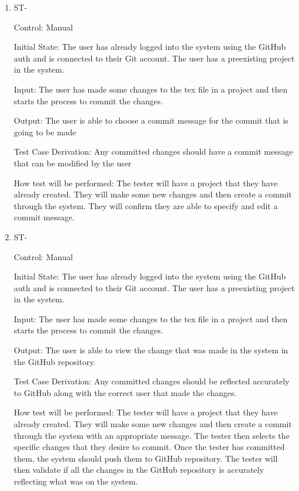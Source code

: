 \documentclass[12pt, titlepage]{article}
\newcounter{TESTID}
\newcommand\TESTNUM{\stepcounter{TESTID}\theTESTID}
\begin{document}
\begin{enumerate}
		\item{ST-\TESTNUM\\}
		
		Control: Manual
		
		Initial State: The user has already logged into the system using the GitHub auth and is connected to their Git account. The user has a preexisting project in the system.
		
		Input: The user has made some changes to the tex file in a project and then starts the process to commit the changes. 
		
		Output: The user is able to choose a commit message for the commit that is going to be made
		
		Test Case Derivation: Any committed changes should have a commit message that can be modified by the user
		
		How test will be performed: The tester will have a project that they have already created. They will make some new changes and then create a commit through the system. They will confirm they are able to specify and edit a commit message.
		
		\item{ST-\TESTNUM\\}
		
		Control: Manual
		
		Initial State: The user has already logged into the system using the GitHub auth and is connected to their Git account. The user has a preexisting project in the system.
		
		Input: The user has made some changes to the tex file in a project and then starts the process to commit the changes. 
		
		Output: The user is able to view the change that was made in the system in the GitHub repository. 
		
		Test Case Derivation: Any committed changes should be reflected accurately to GitHub along with the correct user that made the changes.
		
		How test will be performed: The tester will have a project that they have already created. They will make some new changes and then create a commit through the system with an appropriate message. The tester then selects the specific changes that they desire to commit. Once the tester has committed them, the system should push them to GitHub repository. The tester will then validate if all the changes in the GitHub repository is accurately reflecting what was on the system. 
		
	\end{enumerate}
	
\end{document}
